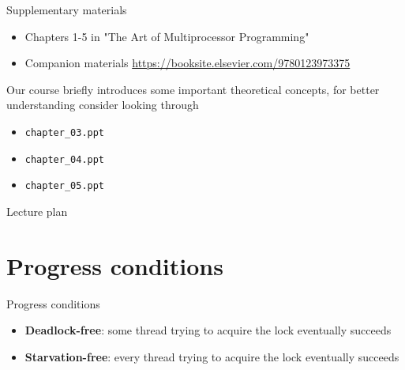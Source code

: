 \begin{frame}{Supplementary materials}

\begin{itemize}
  \item Chapters 1-5 in "The Art of Multiprocessor Programming" 
  \item Companion materials \url{https://booksite.elsevier.com/9780123973375}
\end{itemize}

Our course briefly introduces some important theoretical concepts, for better understanding consider looking through
\begin{itemize}
  \item \texttt{chapter\_03.ppt}  
  \item \texttt{chapter\_04.ppt}
  \item \texttt{chapter\_05.ppt}
\end{itemize}

\end{frame}


\begin{frame}{Lecture plan}
\tableofcontents
\end{frame}


\section{Progress conditions}

\begin{frame}[t]{Progress conditions}

\begin{itemize}

  \item \textbf{Deadlock-free}: some thread trying to acquire the lock eventually succeeds
  \item \textbf{Starvation-free}: every thread trying to acquire the lock eventually succeeds
  
\end{itemize}
\end{frame}



